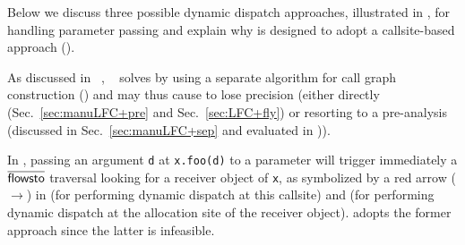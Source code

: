 Below we discuss three possible dynamic dispatch approaches, illustrated in ,  for handling parameter passing and explain why \LF is
designed to adopt a callsite-based approach (). 

As discussed in ~,  \manuLFC~\cite{sridharan2006refinement} solves
 by using a separate algorithm for call graph
construction () and may thus cause  to lose precision 
(either directly (Sec.~\ref{sec:manuLFC+pre} and Sec.~\ref{sec:LFC+fly}) or  resorting to
a pre-analysis \cite{lu2021selective} (discussed in Sec.~\ref{sec:manuLFC+sep} and evaluated in )).



In  \LF, passing an argument \texttt{d} at \texttt{x.foo(d)}  to a parameter will trigger
immediately a $\overline{\textsf{flowsto}}$ traversal  looking for a
receiver object  of \texttt{x}, as symbolized by a red arrow (\textcolor{\colorb}{$\rightarrow$}) in  (for performing dynamic dispatch at this callsite) and  (for performing dynamic dispatch at the allocation site of the receiver object). 
\LF adopts the former approach
since the latter is infeasible.

